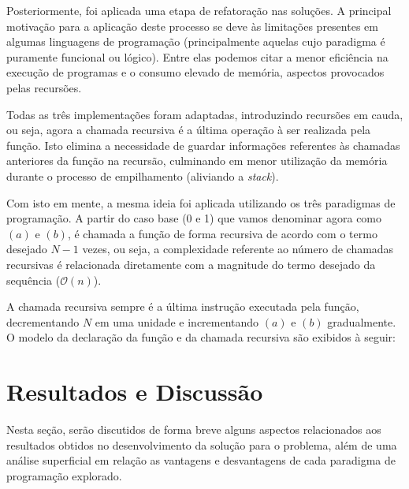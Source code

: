 \documentclass[a4paper, 12pt]{article}
\begin{document}
\begin{center}
    \vspace{0.5cm}
\end{center}

Posteriormente, foi aplicada uma etapa de refatoração nas soluções. A principal motivação para a aplicação deste processo se deve às limitações presentes em algumas linguagens de programação (principalmente aquelas cujo paradigma é puramente funcional ou lógico). Entre elas podemos citar a menor eficiência na execução de programas e o consumo elevado de memória, aspectos provocados pelas recursões.

Todas as três implementações foram adaptadas, introduzindo recursões em cauda, ou seja, agora a chamada recursiva é a última operação à ser realizada pela função. Isto elimina a necessidade de guardar informações referentes às chamadas anteriores da função na recursão, culminando em menor utilização da memória durante o processo de empilhamento (aliviando a \emph{stack}).

Com isto em mente, a mesma ideia foi aplicada utilizando os três paradigmas de programação. A partir do caso base (0 e 1) que vamos denominar agora como \((a)\) e \((b)\), é chamada a função de forma recursiva de acordo com o termo desejado \(N - 1\) vezes, ou seja, a complexidade referente ao número de chamadas recursivas é relacionada diretamente com a magnitude do termo desejado da sequência ($\mathcal{O}(n)$). 

A chamada recursiva sempre é a última instrução executada pela função, decrementando \(N\) em uma unidade e incrementando \((a)\) e \((b)\) gradualmente. O modelo da declaração da função e da chamada recursiva são exibidos à seguir:

\begin{center}
    \vspace{0.5cm}
\end{center}

\section{Resultados e Discussão}

Nesta seção, serão discutidos de forma breve alguns aspectos relacionados aos resultados obtidos no desenvolvimento da solução para o problema, além de uma análise superficial em relação as vantagens e desvantagens de cada paradigma de programação explorado.
\end{document}
